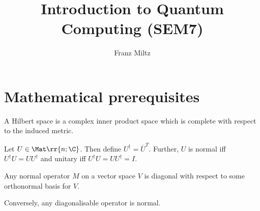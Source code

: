 \documentclass{article}
\title{Introduction to Quantum Computing (SEM7)}
\author{Franz Miltz}
\begin{document}
\maketitle
\tableofcontents
\pagebreak

\section{Mathematical prerequisites}
\label{sec:mathetmatical-prerequisites}

\begin{definition}
  \label{def:hilbert-space}
  A Hilbert space is a complex inner product space which is complete with respect to the induced metric.
\end{definition}

\begin{definition}
  \label{def:unitary-matrix}
  Let $U\in\Mat\rr{n; \C}$. Then define $U^\dagger = \overline{U}^T$. Further, $U$ is normal iff
  $U^\dagger U =UU^\dagger$ and unitary iff $U^\dagger U =UU^\dagger = I$.
\end{definition}

\begin{theorem}
  Any normal operator $M$ on a vector space $V$ is diagonal with respect to some orthonormal
  basis for $V$.

  Conversely, any diagonalisable operator is normal.
\end{theorem}
\end{document}
